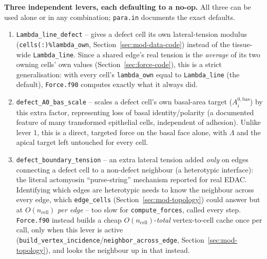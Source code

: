 \documentclass[11pt,a4paper]{report}
\begin{document}
\textbf{Three independent levers, each defaulting to a no-op.} All
three can be used alone or in any combination; \texttt{para.in}
documents the exact defaults.
\begin{enumerate}
  \item \texttt{Lambda\_line\_defect} -- gives a defect cell its own
  lateral-tension modulus (\texttt{cells(:)\%lambda\_own},
  Section~\ref{sec:mod-data-code}) instead of the tissue-wide
  \texttt{Lambda\_line}. Since a shared edge's real tension is the
  \emph{average} of its two owning cells' own values
  (Section~\ref{sec:force-code}), this is a strict generalisation:
  with every cell's \texttt{lambda\_own} equal to \texttt{Lambda\_line}
  (the default), \texttt{Force.f90} computes exactly what it always did.
  \item \texttt{defect\_A0\_bas\_scale} -- scales a defect cell's own
  basal-area target ($A_i^{0,\mathrm{bas}}$) by this extra factor,
  representing loss of basal identity/polarity (a documented feature of
  many transformed epithelial cells, independent of adhesion). Unlike
  lever 1, this is a direct, targeted force on the basal face alone,
  with $\Lambda$ and the apical target left untouched for every cell.
  \item \texttt{defect\_boundary\_tension} -- an extra lateral tension
  added \emph{only} on edges connecting a defect cell to a non-defect
  neighbour (a heterotypic interface): the literal actomyosin
  ``purse-string'' mechanism reported for real EDAC. Identifying which
  edges are heterotypic needs to know the neighbour across every edge,
  which \texttt{edge\_cells} (Section~\ref{sec:mod-topology}) could
  answer but at $O(n_{\mathrm{cell}})$ \emph{per edge} -- too slow for
  \texttt{compute\_forces}, called every step. \texttt{Force.f90}
  instead builds a cheap $O(n_{\mathrm{cell}})$-\emph{total}
  vertex-to-cell cache once per call, only when this lever is active
  (\texttt{build\_vertex\_incidence}/\texttt{neighbor\_across\_edge},
  Section~\ref{sec:mod-topology}), and looks the neighbour up in that
  instead.
\end{enumerate}
\end{document}
